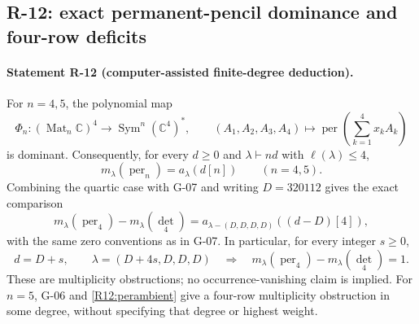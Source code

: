\documentclass[11pt,a4paper]{article}
\theoremstyle{definition}\newtheorem{definition}{Definition}
\begin{document}
\subsection{R-12: exact permanent-pencil dominance and four-row deficits}

\paragraph{Statement R-12 (computer-assisted finite-degree deduction).}
For $n=4,5$, the polynomial map
\[
 \Phi_n:(\operatorname{Mat}_n\mathbb C)^4
 \longrightarrow\operatorname{Sym}^n(\mathbb C^4)^*,
 \qquad(A_1,A_2,A_3,A_4)\longmapsto
 \operatorname{per}\!\left(\sum_{k=1}^4x_kA_k\right)
\]
is dominant. Consequently, for every $d\geq0$ and
$\lambda\vdash nd$ with $\ell(\lambda)\leq4$,
\begin{equation}\label{R12:perambient}
 m_\lambda(\operatorname{per}_n)=a_\lambda(d[n])
 \qquad(n=4,5).
\end{equation}
Combining the quartic case with G-07 and writing $D=320112$ gives
the exact comparison
\begin{equation}\label{R12:deficit}
 m_\lambda(\operatorname{per}_4)-m_\lambda(\det_4)
 =a_{\lambda-(D,D,D,D)}((d-D)[4]),
\end{equation}
with the same zero conventions as in G-07.
In particular, for every integer $s\geq0$,
\begin{equation}\label{R12:gapone}
 d=D+s,\qquad \lambda=(D+4s,D,D,D)
 \quad\Longrightarrow\quad
 m_\lambda(\operatorname{per}_4)-m_\lambda(\det_4)=1.
\end{equation}
These are multiplicity obstructions; no occurrence-vanishing
claim is implied. For $n=5$, G-06 and \eqref{R12:perambient}
give a four-row multiplicity obstruction in some degree, without
specifying that degree or highest weight.
\end{document}
